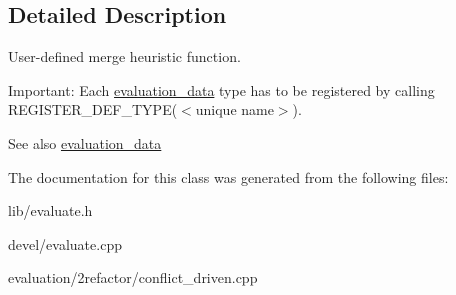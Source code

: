 \subsection{Detailed Description}
User-\/defined merge heuristic function. 

Important\+: Each \hyperlink{classevaluation__data}{evaluation\+\_\+data} type has to be registered by calling R\+E\+G\+I\+S\+T\+E\+R\+\_\+\+D\+E\+F\+\_\+\+T\+Y\+P\+E($<$unique name$>$). \begin{DoxySeeAlso}{See also}
\hyperlink{classevaluation__data}{evaluation\+\_\+data} 
\end{DoxySeeAlso}


The documentation for this class was generated from the following files\+:\begin{DoxyCompactItemize}
\item 
lib/evaluate.\+h\item 
devel/evaluate.\+cpp\item 
evaluation/2refactor/conflict\+\_\+driven.\+cpp\end{DoxyCompactItemize}

